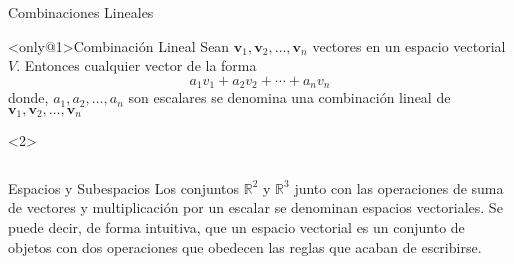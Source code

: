\begin{frame}{Combinaciones Lineales}
  \begin{block}<only@1>{Combinación Lineal} \justifying
    Sean $\bm{v}_1, \bm{v}_2, \ldots, \bm{v}_n$ vectores en un espacio vectorial $V$. Entonces cualquier vector de la forma \[a_1v_1+ a_2v_2+ \cdots+ a_nv_n \] donde, $a_1, a_2, \ldots, a_n$ son escalares se denomina una \alert{combinación lineal} de $\bm{v}_1, \bm{v}_2, \ldots, \bm{v}_n$
  \end{block}

  \begin{onlyenv}<2>
      \begin{columns}[t]
    
    
  \end{columns}
  \end{onlyenv}
\end{frame}


\begin{frame}{Espacios y Subespacios}
  Los conjuntos $\mathbb{R}^2$ y $\mathbb{R}^3$ junto con las operaciones de suma de vectores y multiplicación por un escalar se denominan \alert{espacios vectoriales}. Se puede decir, de forma intuitiva, que un espacio vectorial es un conjunto de objetos con dos operaciones que obedecen las reglas que acaban de escribirse.
\end{frame}


